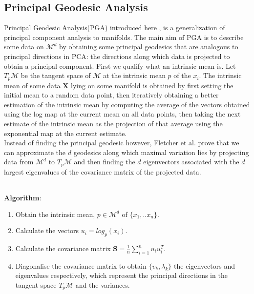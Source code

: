\documentclass[12pt]{report}
\begin{document}
\subsection{Principal Geodesic Analysis}

Principal Geodesic Analysis(PGA) introduced here \cite{pga}, 
is a generalization of principal component analysis to manifolds. 
The main aim of PGA is to describe some data on $\mathcal{M}^d$ 
by obtaining some principal geodesics that are analogous
to principal directions in PCA: the directions along which data is
projected to obtain a principal component.
First we qualify what an intrinsic mean is.
Let $T_p\mathcal{M}$ be the tangent space of $\mathcal{M}$ 
at the intrinsic mean $p$ of the $x_i$. 
The intrinsic mean of some data $\mathbf{X}$ lying on some manifold is obtained 
by first setting the initial mean to a random data point, 
then iteratively obtaining a better estimation of the intrinsic mean 
by computing the average of the vectors obtained using the log map at 
the current mean on all data points, then taking the next estimate of the 
intrinsic mean as the projection of that average using the exponential map 
at the current estimate.\\
Instead of finding the principal geodesic however, Fletcher et al. prove that
we can approximate the $d$ geodesics along which maximal variation lies 
by projecting data from $\mathcal{M}^d$ to $T_p\mathcal{M}$ and then finding the 
$d$ eigenvectors associated with the $d$ largest eigenvalues of the 
covariance matrix of the projected data.

\\
\textbf{Algorithm}:
\begin{enumerate}
    \item Obtain the intrinsic mean, $p \in \mathcal{M}^d$ of $\{x_1,..x_n\}$.
    \item Calculate the vectors $u_i = log_p(x_i)$.
    \item Calculate the covariance matrix $\mathbf{S} = \frac{1}{n} \sum^n_{i=1} u_iu_i^T$.
    \item Diagonalise the covariance matrix to obtain $\{v_k, \lambda_k\}$ 
    the eigenvectors and eigenvalues respectively, 
    which represent the principal directions in the tangent space $T_p\mathcal{M}$ and the variances.
\end{enumerate}
\end{document}

